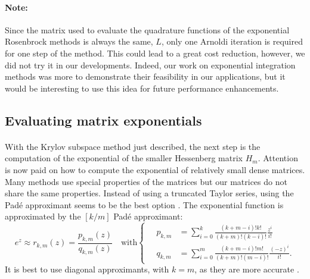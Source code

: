       \paragraph{Note:}
      Since the matrix used to evaluate the quadrature functions of the exponential Rosenbrock methods is always the same, $L$, only one Arnoldi iteration is required for one step of the method.
      This could lead to a great cost reduction, however, we did not try it in our developments.
      Indeed, our work on exponential integration methods was more to demonstrate their feasibility in our applications, but it would be interesting to use this idea for future performance enhancements.


    \subsection{Evaluating matrix exponentials}

      \paragraph{}
      With the Krylov subspace method just described, the next step is the computation of the exponential of the smaller Hessenberg matrix $H_m$.
      Attention is now paid on how to compute the exponential of relatively small dense matrices.
      Many methods use special properties of the matrices but our matrices do not share the same properties.
      Instead of using a truncated Taylor series, using the Padé approximant seems to be the best option \cite{HighamAlMohy2010}.
      The exponential function is approximated by the $\left[k/m\right]$ Padé approximant:
      \begin{equation}
        e^z \approx r_{k,m}\left(z\right) = \frac{p_{k,m}\left(z\right)}{q_{k,m}\left(z\right)} \quad\textrm{with} \left\{\begin{aligned}
          \quad p_{k,m} &= \sum_{i = 0}^k \frac{\left(k + m - i\right)! k!}{\left(k + m\right)! \left(k - i\right)!} \frac{z^i}{i!} \\
          \quad q_{k,m} &= \sum_{i = 0}^m \frac{\left(k + m - i\right)! m!}{\left(k + m\right)! \left(m - i\right)!} \frac{\left(-z\right)^i}{i!} .
        \end{aligned}\right.
      \end{equation}
      It is best to use diagonal approximants, with $k = m$, as they are more accurate \cite{HighamAlMohy2010}.

